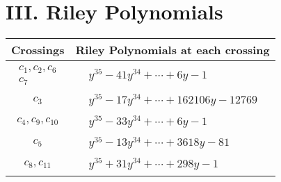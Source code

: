 \documentclass[1p]{elsarticle_modified}
\theoremstyle{definition}
\begin{document}
\centering \section*{ III. Riley Polynomials}
\begin{tabular}{m{50pt}|m{274pt}}
Crossings & \hspace{64pt}Riley Polynomials at each crossing \\
\hline $$\begin{aligned}c_{1},c_{2},c_{6}\\c_{7}\end{aligned}$$&$\begin{aligned}
&y^{35}-41 y^{34}+\cdots+6 y-1
\end{aligned}$\\
\hline $$\begin{aligned}c_{3}\end{aligned}$$&$\begin{aligned}
&y^{35}-17 y^{34}+\cdots+162106 y-12769
\end{aligned}$\\
\hline $$\begin{aligned}c_{4},c_{9},c_{10}\end{aligned}$$&$\begin{aligned}
&y^{35}-33 y^{34}+\cdots+6 y-1
\end{aligned}$\\
\hline $$\begin{aligned}c_{5}\end{aligned}$$&$\begin{aligned}
&y^{35}-13 y^{34}+\cdots+3618 y-81
\end{aligned}$\\
\hline $$\begin{aligned}c_{8},c_{11}\end{aligned}$$&$\begin{aligned}
&y^{35}+31 y^{34}+\cdots+298 y-1
\end{aligned}$\\
\hline
\end{tabular}
\vskip 2pc
\end{document}
